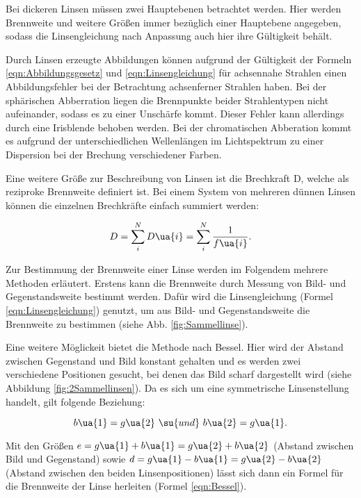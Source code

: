 Bei dickeren Linsen müssen zwei Hauptebenen betrachtet
werden. Hier werden Brennweite und weitere Größen immer bezüglich einer Hauptebene
angegeben, sodass die Linsengleichung nach Anpassung auch hier ihre Gültigkeit behält.

Durch Linsen erzeugte Abbildungen können aufgrund der Gültigkeit der Formeln
\eqref{eqn:Abbildungsgesetz} und \eqref{eqn:Linsengleichung} für achsennahe Strahlen
einen Abbildungsfehler bei der Betrachtung achsenferner Strahlen haben.
Bei der sphärischen Abberration liegen die Brennpunkte beider Strahlentypen nicht
aufeinander, sodass es zu einer Unschärfe kommt. Dieser Fehler kann allerdings
durch eine Irisblende behoben werden. Bei der chromatischen Abberation kommt es
aufgrund der unterschiedlichen Wellenlängen im Lichtspektrum zu einer Dispersion
bei der Brechung verschiedener Farben.

Eine weitere Größe zur Beschreibung von Linsen ist die Brechkraft D, welche als
reziproke Brennweite definiert ist. Bei einem System von mehreren dünnen Linsen
können die einzelnen Brechkräfte einfach summiert werden:

\begin{equation}
  D = \sum_{i}^{N} D\ua{i} = \sum_{i}^{N} \frac{1}{f\ua{i}} .
\end{equation}

Zur Bestimmung der Brennweite einer Linse werden im Folgendem mehrere Methoden erläutert.
Erstens kann die Brennweite durch Messung von Bild- und Gegenstandsweite bestimmt
werden. Dafür wird die Linsengleichung (Formel \eqref{eqn:Linsengleichung}) genutzt,
um aus Bild- und Gegenstandsweite die Brennweite zu bestimmen (siehe Abb.
\ref{fig:Sammellinse}).


Eine weitere Möglickeit bietet die Methode nach Bessel. Hier wird der Abstand zwischen
Gegenstand und Bild konstant gehalten und es werden zwei verschiedene Positionen
gesucht, bei denen das Bild scharf dargestellt wird (siehe Abbildung \ref{fig:2Sammellinsen}).
Da es sich um eine symmetrische Linsenstellung handelt, gilt folgende Beziehung:

\begin{equation}
  b\ua{1} = g\ua{2} \,\, \su{und} \,\, b\ua{2} = g\ua{1} .
\end{equation}

Mit den Größen $e = g\ua{1} + b\ua{1} = g\ua{2} + b\ua{2}$ (Abstand zwischen Bild
und Gegenstand) sowie $d = g\ua{1} - b\ua{1} = g\ua{2} - b\ua{2}$ (Abstand zwischen
den beiden Linsenpositionen) lässt sich dann ein Formel für die Brennweite der
Linse herleiten (Formel \eqref{eqn:Bessel}).

